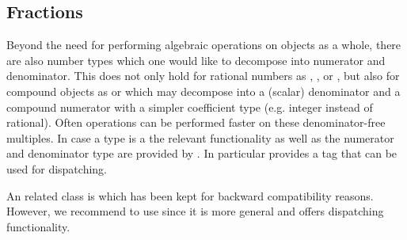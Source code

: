 \subsection{Fractions}

Beyond the need for performing algebraic operations on objects as a 
whole, there are also number types which one would like to decompose into 
numerator and denominator. This does not only hold for rational numbers 
as , ,  or , but 
also for compound objects as  or  
which may decompose into a (scalar) 
denominator and a compound numerator with a simpler coefficient type 
(e.g. integer instead of rational). Often operations can be performed faster on 
these denominator-free multiples. In case a type is a  
the relevant functionality as well as the numerator and denominator 
type are provided by . In particular  
 provides a tag  that can be
used for dispatching.

An related class is  which has been kept for backward 
compatibility reasons. However, we recommend to use  since
it is more general and offers dispatching functionality. 





